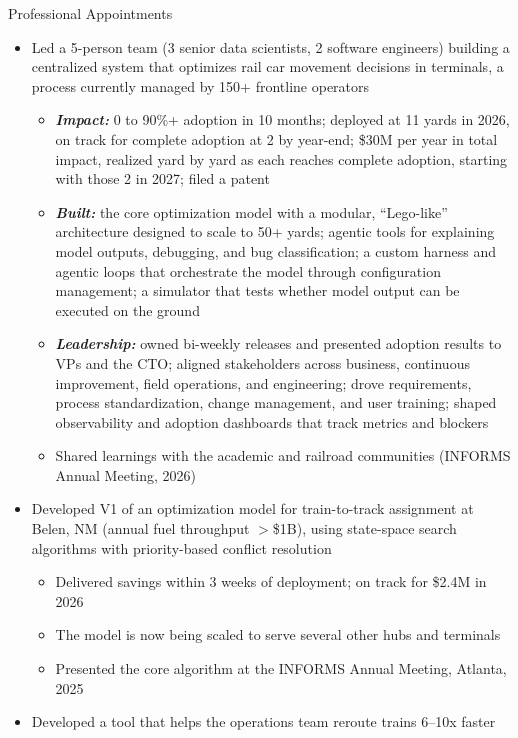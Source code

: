 \begin{rSection}{Professional Appointments}
\begin{itemize}
    \item {}
    Led a 5-person team (3 senior data scientists, 2 software engineers) building a centralized system that optimizes rail car movement decisions in terminals, a process currently managed by 150+ frontline operators
    \begin{itemize}
        \item \textbf{\textit{Impact:}} 0 to 90\%+ adoption in 10 months; deployed at 11 yards in 2026, on track for complete adoption at 2 by year-end; \$30M per year in total impact, realized yard by yard as each reaches complete adoption, starting with those 2 in 2027; filed a patent
        \item \textbf{\textit{Built:}} the core optimization model with a modular, ``Lego-like'' architecture designed to scale to 50+ yards; agentic tools for explaining model outputs, debugging, and bug classification; a custom harness and agentic loops that orchestrate the model through configuration management; a simulator that tests whether model output can be executed on the ground
        \item \textbf{\textit{Leadership:}} owned bi-weekly releases and presented adoption results to VPs and the CTO; aligned stakeholders across business, continuous improvement, field operations, and engineering; drove requirements, process standardization, change management, and user training; shaped observability and adoption dashboards that track metrics and blockers
        \item Shared learnings with the academic and railroad communities (INFORMS Annual Meeting, 2026)
    \end{itemize}
    \item {}
    Developed V1 of an optimization model for train-to-track assignment at Belen, NM (annual fuel throughput $>$\$1B), using state-space search algorithms with priority-based conflict resolution
    \begin{itemize}
        \item Delivered savings within 3 weeks of deployment; on track for \$2.4M in 2026
        \item The model is now being scaled to serve several other hubs and terminals
        \item Presented the core algorithm at the INFORMS Annual Meeting, Atlanta, 2025
    \end{itemize}
    \item {} Developed a tool that helps the operations team reroute trains 6--10x faster
\end{itemize}
\medskip


\end{rSection}
